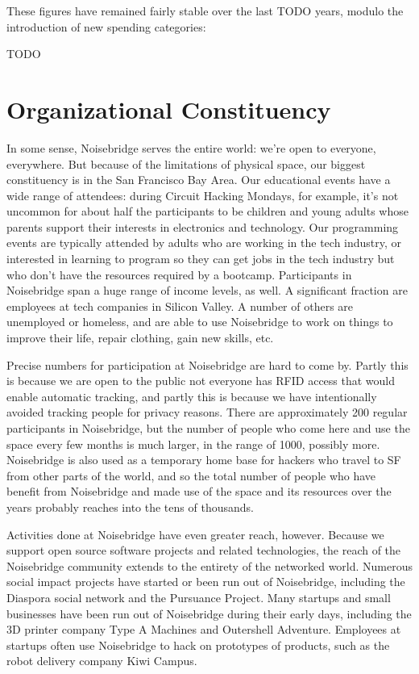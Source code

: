 \documentclass[12pt]{article}
\begin{document}
These figures have remained fairly stable over the last TODO years, modulo the introduction of new spending categories:

TODO

\section{Organizational Constituency}

In some sense, Noisebridge serves the entire world: we're open to everyone, everywhere. But because of the limitations of physical space, our biggest constituency is in the San Francisco Bay Area. Our educational events have a wide range of attendees: during Circuit Hacking Mondays, for example, it's not uncommon for about half the participants to be children and young adults whose parents support their interests in electronics and technology. Our programming events are typically attended by adults who are working in the tech industry, or interested in learning to program so they can get jobs in the tech industry but who don't have the resources required by a bootcamp. Participants in Noisebridge span a huge range of income levels, as well. A significant fraction are employees at tech companies in Silicon Valley. A number of others are unemployed or homeless, and are able to use Noisebridge to work on things to improve their life, repair clothing, gain new skills, etc.

Precise numbers for participation at Noisebridge are hard to come by. Partly this is because we are open to the public not everyone has RFID access that would enable automatic tracking, and partly this is because we have intentionally avoided tracking people for privacy reasons. There are approximately 200 regular participants in Noisebridge, but the number of people who come here and use the space every few months is much larger, in the range of 1000, possibly more. Noisebridge is also used as a temporary home base for hackers who travel to SF from other parts of the world, and so the total number of people who have benefit from Noisebridge and made use of the space and its resources over the years probably reaches into the tens of thousands.

Activities done at Noisebridge have even greater reach, however. Because we support open source software projects and related technologies, the reach of the Noisebridge community extends to the entirety of the networked world. Numerous social impact projects have started or been run out of Noisebridge, including the Diaspora social network and the Pursuance Project. Many startups and small businesses have been run out of Noisebridge during their early days, including the 3D printer company Type A Machines and Outershell Adventure. Employees at startups often use Noisebridge to hack on prototypes of products, such as the robot delivery company Kiwi Campus.
\end{document}
